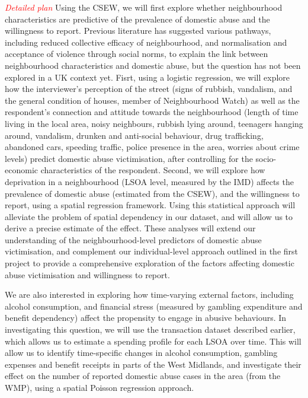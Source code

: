 \documentclass[11pt, a4paper]{article}
\begin{document}
\textcolor{red}{\textit{Detailed plan}} Using the CSEW, we will first explore whether neighbourhood characteristics are predictive of the prevalence of domestic abuse and the willingness to report. Previous literature has suggested various pathways, including reduced collective efficacy of neighbourhood, and normalisation and acceptance of violence through social norms, to explain the link between neighbourhood characteristics and domestic abuse, but the question has not been explored in a UK context yet. Fisrt, using a logistic regression, we will explore how the interviewer's perception of the street (signs of rubbish, vandalism, and the general condition of houses, member of Neighbourhood Watch) as well as the respondent's connection and attitude towards the neighbourhood (length of time living in the local area, noisy neighbours, rubbish lying around, teenagers hanging around, vandalism, drunken and anti-social behaviour, drug trafficking, abandoned cars, speeding traffic, police presence in the area, worries about crime levels) predict domestic abuse victimisation, after controlling for the socio-economic characteristics of the respondent. Second, we will explore how deprivation in a neighbourhood (LSOA level, measured by the IMD) affects the prevalence of domestic abuse (estimated from the CSEW), and the willingness to report, using a spatial regression framework. Using this statistical approach will alleviate the problem of spatial dependency in our dataset, and will allow us to derive a precise estimate of the effect. These analyses will extend our understanding of the neighbourhood-level predictors of domestic abuse victimisation, and complement our individual-level approach outlined in the first project to provide a comprehensive exploration of the factors affecting domestic abuse victimisation and willingness to report. 
 


We are also interested in exploring how time-varying external factors, including alcohol consumption, and financial stress (measured by gambling expenditure and benefit dependency) affect the propensity to engage in abusive behaviours. In investigating this question, we will use the transaction dataset described earlier, which allows us to estimate a spending profile for each LSOA over time. This will allow us to identify time-specific changes in alcohol consumption, gambling expenses and benefit receipts in parts of the West Midlands, and investigate their effect on the number of reported domestic abuse cases in the area (from the WMP), using a spatial Poisson regression approach. 
\end{document}
